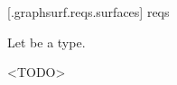  [\iotwod.graphsurf.reqs.surfaces]{ reqs}

\pnum
Let  be a \graphicssurfacestemplparam type.

\pnum
<TODO>

%

